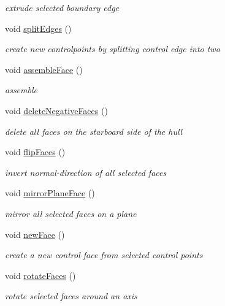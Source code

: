 \begin{DoxyCompactItemize}
\begin{DoxyCompactList}\small\item\em extrude selected boundary edge \end{DoxyCompactList}\item 
void \hyperlink{classShipCAD_1_1Controller_a0737f31baec832fa23070d3d2accce20}{split\+Edges} ()
\begin{DoxyCompactList}\small\item\em create new controlpoints by splitting control edge into two \end{DoxyCompactList}\item 
void \hyperlink{classShipCAD_1_1Controller_afba338b6c9bff947b850c220d031a7de}{assemble\+Face} ()
\begin{DoxyCompactList}\small\item\em assemble \end{DoxyCompactList}\item 
void \hyperlink{classShipCAD_1_1Controller_a5ff6228a1b2fd0400ba51a8ab7ee01a8}{delete\+Negative\+Faces} ()
\begin{DoxyCompactList}\small\item\em delete all faces on the starboard side of the hull \end{DoxyCompactList}\item 
void \hyperlink{classShipCAD_1_1Controller_a6314812b2170bdbbf17e79374e745005}{flip\+Faces} ()
\begin{DoxyCompactList}\small\item\em invert normal-\/direction of all selected faces \end{DoxyCompactList}\item 
void \hyperlink{classShipCAD_1_1Controller_a2f7c4f8e0759c8f59cd0b2d008e2776b}{mirror\+Plane\+Face} ()
\begin{DoxyCompactList}\small\item\em mirror all selected faces on a plane \end{DoxyCompactList}\item 
void \hyperlink{classShipCAD_1_1Controller_ad2bc80eb2e8445e335709804120e80f8}{new\+Face} ()
\begin{DoxyCompactList}\small\item\em create a new control face from selected control points \end{DoxyCompactList}\item 
void \hyperlink{classShipCAD_1_1Controller_a288d168e5160d0409d5e4472e2ad1d5b}{rotate\+Faces} ()
\begin{DoxyCompactList}\small\item\em rotate selected faces around an axis \end{DoxyCompactList}\item 

\end{DoxyCompactItemize}
